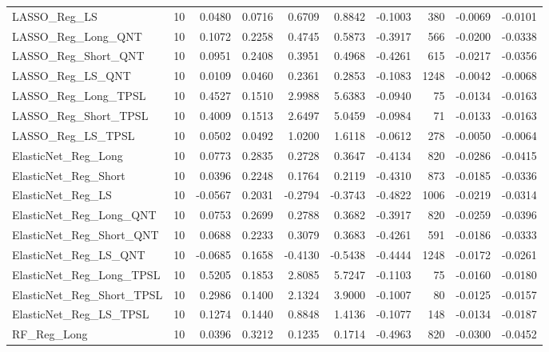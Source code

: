 \begin{tabular}{llrrrrrrrr}
\cline{1-10}
LASSO\_Reg\_LS & 10 & 0.0480 & 0.0716 & 0.6709 & 0.8842 & -0.1003 & 380 & -0.0069 & -0.0101 \\
\cline{1-10}
LASSO\_Reg\_Long\_QNT & 10 & 0.1072 & 0.2258 & 0.4745 & 0.5873 & -0.3917 & 566 & -0.0200 & -0.0338 \\
\cline{1-10}
LASSO\_Reg\_Short\_QNT & 10 & 0.0951 & 0.2408 & 0.3951 & 0.4968 & -0.4261 & 615 & -0.0217 & -0.0356 \\
\cline{1-10}
LASSO\_Reg\_LS\_QNT & 10 & 0.0109 & 0.0460 & 0.2361 & 0.2853 & -0.1083 & 1248 & -0.0042 & -0.0068 \\
\cline{1-10}
LASSO\_Reg\_Long\_TPSL & 10 & 0.4527 & 0.1510 & 2.9988 & 5.6383 & -0.0940 & 75 & -0.0134 & -0.0163 \\
\cline{1-10}
LASSO\_Reg\_Short\_TPSL & 10 & 0.4009 & 0.1513 & 2.6497 & 5.0459 & -0.0984 & 71 & -0.0133 & -0.0163 \\
\cline{1-10}
LASSO\_Reg\_LS\_TPSL & 10 & 0.0502 & 0.0492 & 1.0200 & 1.6118 & -0.0612 & 278 & -0.0050 & -0.0064 \\
\cline{1-10}
ElasticNet\_Reg\_Long & 10 & 0.0773 & 0.2835 & 0.2728 & 0.3647 & -0.4134 & 820 & -0.0286 & -0.0415 \\
\cline{1-10}
ElasticNet\_Reg\_Short & 10 & 0.0396 & 0.2248 & 0.1764 & 0.2119 & -0.4310 & 873 & -0.0185 & -0.0336 \\
\cline{1-10}
ElasticNet\_Reg\_LS & 10 & -0.0567 & 0.2031 & -0.2794 & -0.3743 & -0.4822 & 1006 & -0.0219 & -0.0314 \\
\cline{1-10}
ElasticNet\_Reg\_Long\_QNT & 10 & 0.0753 & 0.2699 & 0.2788 & 0.3682 & -0.3917 & 820 & -0.0259 & -0.0396 \\
\cline{1-10}
ElasticNet\_Reg\_Short\_QNT & 10 & 0.0688 & 0.2233 & 0.3079 & 0.3683 & -0.4261 & 591 & -0.0186 & -0.0333 \\
\cline{1-10}
ElasticNet\_Reg\_LS\_QNT & 10 & -0.0685 & 0.1658 & -0.4130 & -0.5438 & -0.4444 & 1248 & -0.0172 & -0.0261 \\
\cline{1-10}
ElasticNet\_Reg\_Long\_TPSL & 10 & 0.5205 & 0.1853 & 2.8085 & 5.7247 & -0.1103 & 75 & -0.0160 & -0.0180 \\
\cline{1-10}
ElasticNet\_Reg\_Short\_TPSL & 10 & 0.2986 & 0.1400 & 2.1324 & 3.9000 & -0.1007 & 80 & -0.0125 & -0.0157 \\
\cline{1-10}
ElasticNet\_Reg\_LS\_TPSL & 10 & 0.1274 & 0.1440 & 0.8848 & 1.4136 & -0.1077 & 148 & -0.0134 & -0.0187 \\
\cline{1-10}
RF\_Reg\_Long & 10 & 0.0396 & 0.3212 & 0.1235 & 0.1714 & -0.4963 & 820 & -0.0300 & -0.0452 \\

\end{tabular}
